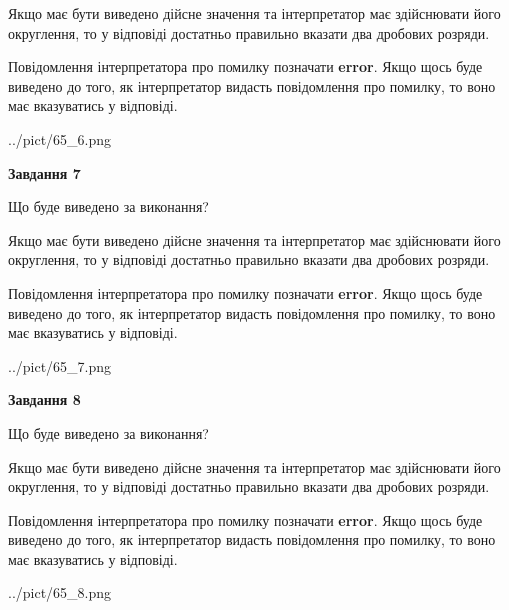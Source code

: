 \documentclass[12pt, ukrainian]{article}
\begin{document}
{\begin {Large}
Якщо має бути виведено дійсне значення та інтерпретатор має здійснювати його округлення, 
то у відповіді достатньо правильно вказати два дробових розряди.

Повідомлення інтерпретатора про помилку позначати \textbf{error}.
Якщо щось буде виведено до того, як інтерпретатор видасть повідомлення про помилку, 
то воно має вказуватись у відповіді. \par

\begin{center}
	{../pict/65_6.png}
\end{center}
\newpage

{\begin {center}\textbf{Завдання 7}\end {center}}\par
Що буде виведено за виконання? \par

Якщо має бути виведено дійсне значення та інтерпретатор має здійснювати його округлення, 
то у відповіді достатньо правильно вказати два дробових розряди.

Повідомлення інтерпретатора про помилку позначати \textbf{error}.
Якщо щось буде виведено до того, як інтерпретатор видасть повідомлення про помилку, 
то воно має вказуватись у відповіді. \par

\begin{center}
	{../pict/65_7.png}
\end{center}
\newpage

{\begin {center}\textbf{Завдання 8}\end {center}}\par
Що буде виведено за виконання? \par

Якщо має бути виведено дійсне значення та інтерпретатор має здійснювати його округлення, 
то у відповіді достатньо правильно вказати два дробових розряди.

Повідомлення інтерпретатора про помилку позначати \textbf{error}.
Якщо щось буде виведено до того, як інтерпретатор видасть повідомлення про помилку, 
то воно має вказуватись у відповіді. \par

\begin{center}
	{../pict/65_8.png}
\end{center}
\newpage


\end{Large}}
\end{document}
